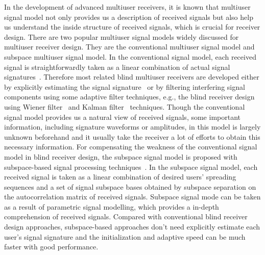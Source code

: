 \documentclass[a4paper,10pt,fleqn, twocolumn]{IEEETran}
\begin{document}
In the development of advanced multiuser receivers, it is known
that multiuser signal model not only provides us a description of
received signals but also help us understand the inside structure
of received signals, which is crucial for receiver design. There
are two popular multiuser signal models widely discussed for
multiuser receiver design. They are the conventional multiuser
signal model and subspace multiuser signal model. In the
conventional signal model, each received signal is
straightforwardly taken as a linear combination of actual signal
signatures~\cite{Verd98,Madh94,Honi95,Zhang02}. Therefore most
related blind multiuser receivers are developed either by
explicitly estimating the signal signature~\cite{Torl97} or by
filtering interfering signal components using some adaptive filter
techniques, e.g., the blind receiver design using Wiener
filter~\cite{Madh94,Honi95} and Kalman filter~\cite{Zhang02}
techniques. Though the conventional signal model provides us a
natural view of received signals, some important information,
including signature waveforms or amplitudes, in this model is
largely unknown beforehand and it usually take the receiver a lot
of efforts to obtain this necessary information. For compensating
the weakness of the conventional signal model in blind receiver
design, the subspace signal model is proposed with subspace-based
signal processing techniques~\cite{Wang98}. In the subspace signal
model, each received signal is taken as a linear combination of
desired users' spreading sequences and a set of signal subspace
bases obtained by subspace separation on the autocorrelation
matrix of received signals. Subspace signal mode can be taken as a
result of parametric signal modelling, which provides a in-depth
comprehension of received signals. Compared with conventional
blind receiver design approaches, subspace-based approaches don't
need explicitly estimate each user's signal signature and the
initialization and adaptive speed can be much faster with good
performance.
\end{document}
